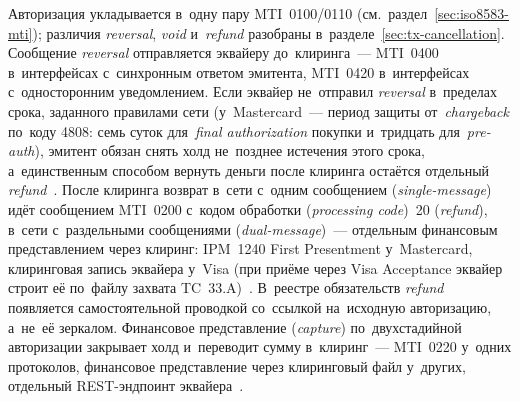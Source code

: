 Авторизация укладывается в~одну пару MTI~0100/0110
(см.~раздел~\ref{sec:iso8583-mti});
различия \textit{reversal}, \textit{void} и~\textit{refund} разобраны в~разделе~\ref{sec:tx-cancellation}.
Сообщение \textit{reversal} отправляется эквайеру до~клиринга~--- MTI~0400
в~интерфейсах с~синхронным ответом эмитента, MTI~0420 в~интерфейсах
с~односторонним уведомлением. Если эквайер
не~отправил \textit{reversal} в~пределах срока, заданного правилами сети
(у~Mastercard~--- период защиты от~\textit{chargeback} по~коду 4808: семь суток
для~\textit{final authorization} покупки и~тридцать для~\textit{pre-auth}),
эмитент обязан снять холд не~позднее истечения этого срока,
а~единственным способом вернуть деньги после клиринга остаётся отдельный
\textit{refund}~\cite{mc-tpr}. После клиринга возврат в~сети с~одним сообщением (\textit{single-message}) идёт
сообщением MTI~0200 с~кодом обработки (\textit{processing code})~20
(\textit{refund}), в~сети с~раздельными сообщениями (\textit{dual-message})~--- отдельным финансовым представлением через
клиринг: IPM~1240 First Presentment у~Mastercard, клиринговая запись эквайера
у~Visa (при приёме через Visa Acceptance эквайер строит её по~файлу захвата
TC~33.A)~\cite{mc-gcms-rm-2021,visa-tc33a-capture-file}. В~реестре обязательств
\textit{refund} появляется самостоятельной проводкой со~ссылкой на~исходную авторизацию,
а~не~её зеркалом. Финансовое
представление (\textit{capture}) по~двухстадийной авторизации закрывает
холд и~переводит сумму в~клиринг~--- MTI~0220 у~одних протоколов,
финансовое представление через клиринговый файл у~других, отдельный
REST-эндпоинт эквайера~\cite{mc-gcms-rm-2021,visa-tc33a-capture-file}.

